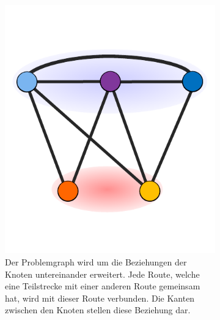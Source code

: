 \begin{figure}
\begin{subfigure}[t]{0.3\textwidth}
		\includegraphics[width=\textwidth]{img/bsp4}
		\caption{Der Problemgraph wird um die Beziehungen der Knoten untereinander erweitert. Jede Route, welche eine Teilstrecke mit einer anderen Route
		gemeinsam hat, wird mit dieser Route verbunden. Die Kanten zwischen den Knoten stellen diese Beziehung dar.}
		\label{fig:example:d}
	\end{subfigure}
	\begin{subfigure}[t]{0.3\textwidth}

\end{subfigure}
\end{figure}
